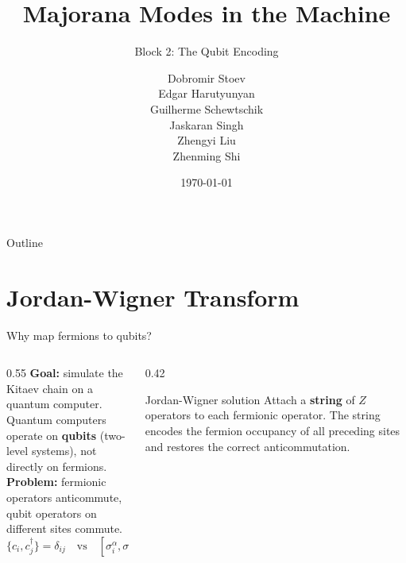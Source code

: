 \documentclass[aspectratio=169, 12pt]{beamer}
\title[Kitaev Chain — Block 2]{Majorana Modes in the Machine}
\subtitle{Block 2: The Qubit Encoding}
\author{Dobromir Stoev\\ Edgar Harutyunyan\\ Guilherme Schewtschik\\ Jaskaran Singh\\ Zhengyi Liu\\ Zhenming Shi}
\institute{Advanced Seminar — AI-Augmented Theoretical Physics}
\date{\today}
\begin{document}
\begin{frame}
  \titlepage
\end{frame}

\begin{frame}{Outline}
  \tableofcontents
\end{frame}

\section{Jordan-Wigner Transform}

\begin{frame}{Why map fermions to qubits?}
  \begin{columns}[T]
    \begin{column}{0.55\textwidth}
      \textbf{Goal:} simulate the Kitaev chain on a quantum computer.\\[6pt]
      Quantum computers operate on \textbf{qubits} (two-level systems),
      not directly on fermions.\\[6pt]
      \textbf{Problem:} fermionic operators anticommute,
      qubit operators on different sites commute.
      \begin{equation*}
        \{c_i, c_j^\dagger\} = \delta_{ij} \quad \text{vs} \quad
        [\sigma_i^\alpha, \sigma_j^\beta] = 0 \; (i \neq j)
      \end{equation*}
    \end{column}
    \begin{column}{0.42\textwidth}
      \begin{block}{Jordan-Wigner solution}
        Attach a \textbf{string} of $Z$ operators to each fermionic
        operator. The string encodes the fermion occupancy of all
        preceding sites and restores the correct anticommutation.
      \end{block}
    \end{column}
  \end{columns}
\end{frame}
\end{document}
